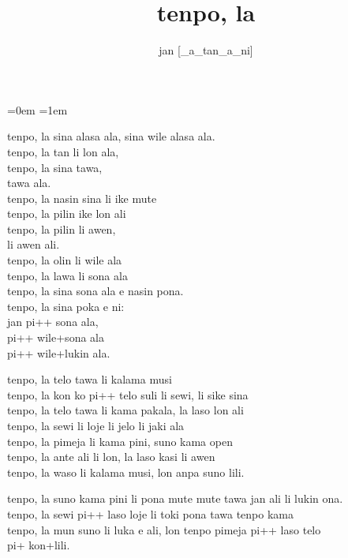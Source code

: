 \documentclass{article}
\title{tenpo, la}
\author{jan {[}\_a\_tan\_a\_ni{]}}
\date{}
\begin{document}
    \parindent=0em
    \parskip=1em
    \large

    \maketitle
    tenpo, la sina alasa ala, sina wile alasa ala. \\
    tenpo, la tan li lon ala, \\
    tenpo, la sina tawa, \\
    tawa ala. \\

    tenpo, la nasin sina li ike mute \\
    tenpo, la pilin ike lon ali \\
    tenpo, la pilin li awen, \\
    li awen ali. \\

    tenpo, la olin li wile ala \\
    tenpo, la lawa li sona ala \\
    tenpo, la sina sona ala e nasin pona. \\

    tenpo, la sina poka e ni: \\
    jan pi++ sona ala, \\
    pi++ wile+sona ala \\
    pi++ wile+lukin ala. \\

    \bigskip

    tenpo, la telo tawa li kalama musi \\
    tenpo, la kon ko pi++ telo suli li sewi, li sike sina \\
    tenpo, la telo tawa li kama pakala, la laso lon ali \\

    tenpo, la sewi li loje li jelo li jaki ala \\
    tenpo, la pimeja li kama pini, suno kama open \\
    tenpo, la ante ali li lon, la laso kasi li awen \\
    tenpo, la waso li kalama musi, lon anpa suno lili.

    tenpo, la suno kama pini li pona mute mute tawa jan ali li lukin ona. \\
    tenpo, la sewi pi++ laso loje li toki pona tawa tenpo kama \\
    tenpo, la mun suno li luka e ali, lon tenpo pimeja pi++ laso telo \\
    pi+ kon+lili.
\end{document}
